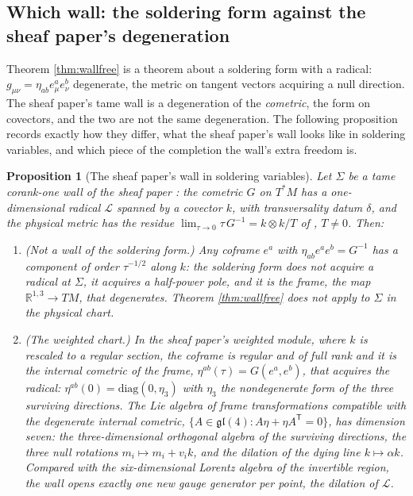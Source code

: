 \documentclass[11pt]{article}
\newtheorem{proposition}[theorem]{Proposition}
\theoremstyle{definition}
\begin{document}
\subsection{Which wall: the soldering form against the sheaf paper's degeneration}\label{subsec:whichwall}

Theorem \ref{thm:wallfree} is a theorem about a soldering form with a radical: $g_{\mu\nu} = \eta_{ab}e^a_\mu e^b_\nu$ degenerate, the metric on tangent vectors acquiring a null direction. The sheaf paper's tame wall is a degeneration of the \emph{cometric}, the form on covectors, and the two are not the same degeneration. The following proposition records exactly how they differ, what the sheaf paper's wall looks like in soldering variables, and which piece of the completion the wall's extra freedom is.

\begin{proposition}[The sheaf paper's wall in soldering variables]\label{prop:whichwall}
Let $\Sigma$ be a tame corank-one wall of the sheaf paper \cite[Hyp.~2.1, Thm.~3.1]{ButlerT4}: the cometric $G$ on $T^*M$ has a one-dimensional radical $\mathcal{L}$ spanned by a covector $k$, with transversality datum $\delta$, and the physical metric has the residue $\lim_{\tau\to 0}\tau\, G^{-1} = k\otimes k/T$ of \cite[Thm.~6.2]{ButlerT4}, $T \neq 0$. Then:
\begin{enumerate}
\item[(i)] \emph{(Not a wall of the soldering form.)} Any coframe $e^a$ with $\eta_{ab}e^a e^b = G^{-1}$ has a component of order $\tau^{-1/2}$ along $k$: the soldering form does not acquire a radical at $\Sigma$, it acquires a half-power pole, and it is the frame, the map $\mathbb{R}^{1,3} \to TM$, that degenerates. Theorem \ref{thm:wallfree} does not apply to $\Sigma$ in the physical chart.
\item[(ii)] \emph{(The weighted chart.)} In the sheaf paper's weighted module, where $k$ is rescaled to a regular section, the coframe is regular and of full rank and it is the internal cometric of the frame, $\eta^{ab}(\tau) = G(e^a, e^b)$, that acquires the radical: $\eta^{ab}(0) = \mathrm{diag}(0, \eta_3)$ with $\eta_3$ the nondegenerate form of the three surviving directions. The Lie algebra of frame transformations compatible with the degenerate internal cometric, $\{A \in \mathfrak{gl}(4) : A\eta + \eta A^{\mathsf T} = 0\}$, has dimension seven: the three-dimensional orthogonal algebra of the surviving directions, the three null rotations $m_i \mapsto m_i + v_i k$, and the dilation of the dying line $k \mapsto \alpha k$. Compared with the six-dimensional Lorentz algebra of the invertible region, the wall opens exactly one new gauge generator per point, the dilation of $\mathcal{L}$.

\end{enumerate}
\end{proposition}
\end{document}
